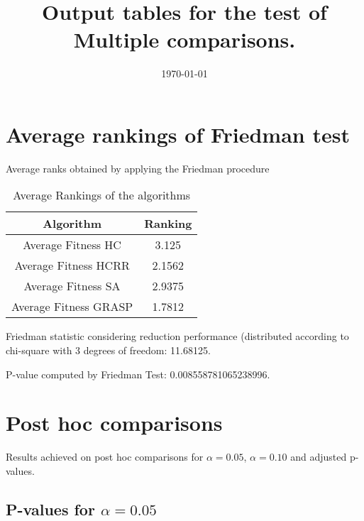 \documentclass[a4paper,10pt]{article}
\title{Output tables for the test of Multiple comparisons.}
\author{}
\date{\today}
\begin{document}
\begin{landscape}
\pagestyle{empty}
\maketitle
\thispagestyle{empty}
\section{Average rankings of Friedman test}



Average ranks obtained by applying the Friedman procedure

\begin{table}[!htp]
\centering
\begin{tabular}{|c|c|}\hline
Algorithm&Ranking\\\hline
Average Fitness HC       & 3.125\\
Average Fitness HCRR    & 2.1562\\
Average Fitness SA      & 2.9375\\
Average Fitness GRASP & 1.7812\\
\hline
\end{tabular}
\caption{Average Rankings of the algorithms}
\end{table}

Friedman statistic considering reduction performance (distributed according to chi-square with 3 degrees of freedom: 11.68125.

P-value computed by Friedman Test: 0.008558781065238996.\newline



\pagebreak

\section{Post hoc comparisons}

Results achieved on post hoc comparisons for $\alpha = 0.05$, $\alpha = 0.10$ and adjusted p-values.

\subsection{P-values for $\alpha=0.05$}


\end{landscape}
\end{document}
